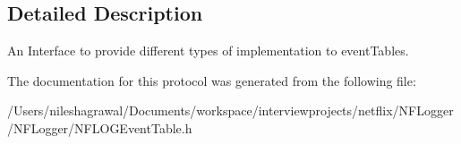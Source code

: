 \subsection{Detailed Description}
An Interface to provide different types of implementation to event\+Tables. 

The documentation for this protocol was generated from the following file\+:\begin{DoxyCompactItemize}
\item 
/\+Users/nileshagrawal/\+Documents/workspace/interviewprojects/netflix/\+N\+F\+Logger/\+N\+F\+Logger/N\+F\+L\+O\+G\+Event\+Table.\+h\end{DoxyCompactItemize}
